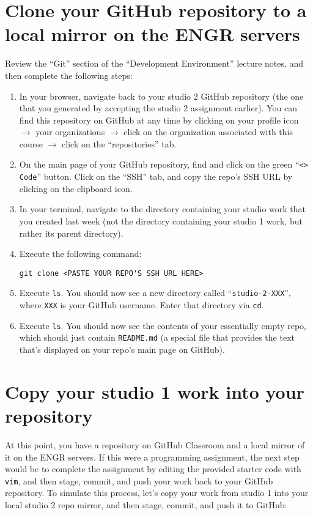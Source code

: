 \documentclass{article}
\begin{document}
\section{Clone your GitHub repository to a local mirror on the ENGR servers}

Review the ``Git'' section of the ``Development Environment'' lecture notes, and then complete the following steps:

\begin{enumerate}
    \item In your browser, navigate back to your studio 2 GitHub repository (the one that you generated by accepting the studio 2 assignment earlier). You can find this repository on GitHub at any time by clicking on your profile icon $\rightarrow$ your organizations $\rightarrow$ click on the organization associated with this course $\rightarrow$ click on the ``repositories'' tab.
    \item On the main page of your GitHub repository, find and click on the green ``\texttt{<> Code}'' button. Click on the ``SSH'' tab, and copy the repo's SSH URL by clicking on the clipboard icon.
    \item In your terminal, navigate to the directory containing your studio work that you created last week (not the directory containing your studio 1 work, but rather its parent directory).
    \item Execute the following command:

    \begin{verbatim}
git clone <PASTE YOUR REPO'S SSH URL HERE>
    \end{verbatim}
    \item Execute \texttt{ls}. You should now see a new directory called ``\texttt{studio-2-XXX}'', where \texttt{XXX} is your GitHub username. Enter that directory via \texttt{cd}.
    \item Execute \texttt{ls}. You should now see the contents of your essentially empty repo, which should just contain \texttt{README.md} (a special file that provides the text that's displayed on your repo's main page on GitHub).
\end{enumerate}

\section{Copy your studio 1 work into your repository}

At this point, you have a repository on GitHub Classroom and a local mirror of it on the ENGR servers. If this were a programming assignment, the next step would be to complete the assignment by editing the provided starter code with \texttt{vim}, and then stage, commit, and push your work back to your GitHub repository. To simulate this process, let's copy your work from studio 1 into your local studio 2 repo mirror, and then stage, commit, and push it to GitHub:
\end{document}

